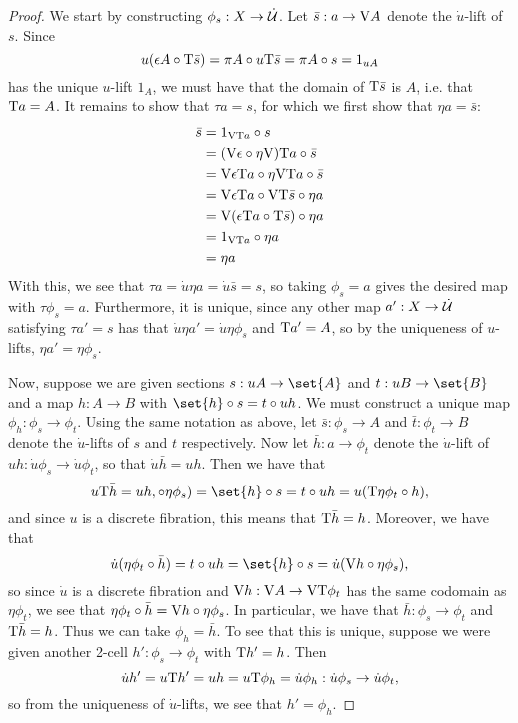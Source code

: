 \documentclass[../thesis.tex]{subfiles}
\begin{document}
\begin{proof}
  We start by constructing $\phi_s : X \to \dot{{\mathcal{U}}}$. Let $\bar s : a \to {{\mathrm{V}}} A$ denote the $\dot u$-lift of $s$. Since
  \[ u(\epsilon A \circ {{\mathrm{T}}}\bar s) = \pi A \circ u{{\mathrm{T}}} \bar s = \pi A \circ s = 1_{uA}\]
  has the unique $u$-lift $1_A$, we must have that the domain of ${{\mathrm{T}}}\bar s$ is $A$, i.e. that ${{\mathrm{T}}} a = A$. It remains to
  show that $\tau a = s$, for which we first show that $\eta a = \bar s$:
  \begin{align*}
    \bar s & = 1_{{{\mathrm{V}}}{{\mathrm{T}}} a} \circ s \\
           & = ({{\mathrm{V}}}\epsilon \circ \eta{{\mathrm{V}}}){{\mathrm{T}}} a \circ \bar s \\
           & = {{\mathrm{V}}}\epsilon{{\mathrm{T}}} a \circ \eta{{\mathrm{V}}}{{\mathrm{T}}} a \circ \bar s \\
           & = {{\mathrm{V}}}\epsilon{{\mathrm{T}}} a \circ {{\mathrm{V}}}{{\mathrm{T}}}\bar s \circ \eta a \\
           & = {{\mathrm{V}}}(\epsilon {{\mathrm{T}}} a \circ {{\mathrm{T}}} \bar s) \circ \eta a \\
           & = 1_{{{\mathrm{V}}}{{\mathrm{T}}} a} \circ \eta a \\
           & = \eta a
  \end{align*}
  With this, we see that $\tau a = \dot u \eta a = \dot u \bar s = s$, so taking $\phi_s = a$ gives the desired map with
  $\tau \phi_s = a$. Furthermore, it is unique, since any other map $a' : X \to \dot{{\mathcal{U}}}$ satisfying $\tau a' = s$ has that
  $\dot u \eta a' = \dot u \eta \phi_s$ and ${{\mathrm{T}}} a' = A$, so by the uniqueness of $u$-lifts, $\eta a' = \eta \phi_s$.
  
  Now, suppose we are given sections $s : uA \to \set{A}$ and $t : uB \to \set{B}$ and a map $h : A \to B$ with $\set{h} \circ
  s = t \circ uh$. We must construct a unique map $\phi_h: \phi_s \to \phi_t$. Using the same notation as above, let $\bar s :
  \phi_s \to A$ and $\bar t : \phi_t \to B$ denote the $\dot u$-lifts of $s$ and $t$ respectively. Now let $\bar h :
  a \to \phi_t$ denote the $\dot u$-lift of $uh : \dot u \phi_s \to \dot u \phi_t$, so that $\dot u\bar h =
  uh$. Then we have that
  \[
    u\typ\bar h = uh,\circ \eta\phi_s) = \set{h} \circ s = t \circ uh = u(\typ\eta\phi_t \circ h),
  \]
  and since $u$ is a discrete fibration, this means that ${{\mathrm{T}}}\bar h = h$. Moreover, we have that
  \[\dot u (\eta \phi_t \circ \bar h) = t \circ uh = \set{h} \circ s = \dot u(\var h \circ \eta\phi_s),\]
  so since $\dot u$ is a discrete fibration and ${{\mathrm{V}}} h : {{\mathrm{V}}} A \to {{\mathrm{V}}}{{\mathrm{T}}} \phi_t$ has the same codomain as $\eta \phi_t$,
  we see that $\eta \phi_t \circ \bar h = {{\mathrm{V}}} h \circ \eta\phi_s$. In particular, we have that $\bar h : \phi_s \to \phi_t$
  and ${{\mathrm{T}}}\bar h = h$. Thus we can take $\phi_h = \bar h$. To see that this is unique, suppose we were given another 2-cell
  $h' : \phi_s \to \phi_t$ with ${{\mathrm{T}}} h' = h$. Then
  \[\dot u h' = u{{\mathrm{T}}} h' = u h = u {{\mathrm{T}}} \phi_h = \dot u \phi_h : \dot u \phi_s \to \dot u \phi_t,\]
  so from the uniqueness of $\dot u$-lifts, we see that $h' = \phi_h$.
  

\end{proof}
\end{document}
